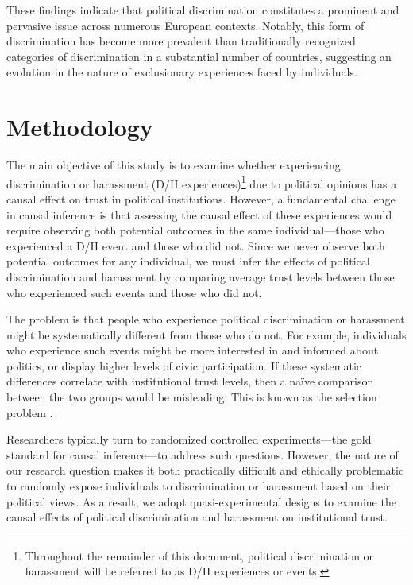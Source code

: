 \documentclass{article}
\begin{document}
These findings indicate that political discrimination constitutes a prominent and pervasive issue across numerous European contexts. Notably, this form of discrimination has become more prevalent than traditionally recognized categories of discrimination in a substantial number of countries, suggesting an evolution in the nature of exclusionary experiences faced by individuals.



\section{Methodology}

The main objective of this study is to examine whether experiencing discrimination or harassment (D/H experiences)\footnote{Throughout the remainder of this document, political discrimination or harassment will be referred to as D/H experiences or events.} due to political opinions has a causal effect on trust in political institutions. However, a fundamental challenge in causal inference is that assessing the causal effect of these experiences would require observing both potential outcomes in the same individual—those who experienced a D/H event and those who did not. Since we never observe both potential outcomes for any individual, we must infer the effects of political discrimination and harassment by comparing average trust levels between those who experienced such events and those who did not.

The problem is that people who experience political discrimination or harassment might be systematically different from those who do not. For example, individuals who experience such events might be more interested in and informed about politics, or display higher levels of civic participation. If these systematic differences correlate with institutional trust levels, then a naïve comparison between the two groups would be misleading. This is known as the selection problem \parencite{angrist_mostly_2009}.

Researchers typically turn to randomized controlled experiments—the gold standard for causal inference—to address such questions. However, the nature of our research question makes it both practically difficult and ethically problematic to randomly expose individuals to discrimination or harassment based on their political views. As a result, we adopt quasi-experimental designs to examine the causal effects of political discrimination and harassment on institutional trust.
\end{document}
